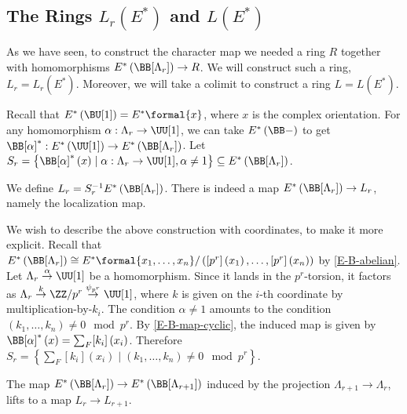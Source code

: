 \subsection{The Rings \texorpdfstring{$L_r\left(E^*\right)$}{Lr(E*)} and \texorpdfstring{$L\left(E^*\right)$}{L(E*)}}

As we have seen, to construct the character map we needed a ring $R$ together with homomorphisms $E^*\left(\BB[\Lambda_r]\right) \to R$.
We will construct such a ring, $L_r = L_r\left(E^*\right)$.
Moreover, we will take a colimit to construct a ring $L = L\left(E^*\right)$.

Recall that $E^*\left(\BU[1]\right) = E^*\formal{x}$, where $x$ is the complex orientation.
For any homomorphism $\alpha: \Lambda_r \to \UU[1]$, we can take $E^*\left(\BB-\right)$ to get $\BB[\alpha]^*: E^*\left(\UU[1]\right) \to E^*\left(\BB[\Lambda_r]\right)$.
Let $S_r = \left\{ \BB[\alpha]^*\left(x\right) \mid \alpha: \Lambda_r \to \UU[1], \alpha \neq 1 \right\} \subseteq E^*\left(\BB[\Lambda_r]\right)$.

\begin{definition}\label{Lr}
	We define $L_r = S_r^{-1} E^*\left(\BB[\Lambda_r]\right)$.
	There is indeed a map $E^*\left(\BB[\Lambda_r]\right) \to L_r$, namely the localization map.
\end{definition}

We wish to describe the above construction with coordinates, to make it more explicit.
Recall that $E^*\left(\BB[\Lambda_r]\right) \cong E^*\formal{x_1, \dotsc, x_n}/\left(\left[p^r\right]\left(x_1\right), \dotsc, \left[p^r\right]\left(x_n\right)\right)$ by \cref{E-B-abelian}.
Let $\Lambda_r \overset{\alpha}{\to} \UU[1]$ be a homomorphism.
Since it lands in the $p^r$-torsion, it factors as $\Lambda_r \overset{k}{\to} \ZZ/{p^r} \overset{\psi_{p^r}}{\to} \UU[1]$, where $k$ is given on the $i$-th coordinate by multiplication-by-$k_i$.
The condition $\alpha \neq 1$ amounts to the condition $\left(k_1, \dotsc, k_n\right) \neq 0 \mod p^r$.
By \cref{E-B-map-cyclic}, the induced map is given by $\BB[\alpha]^*\left(x\right) = \sum_F [k_i]\left(x_i\right)$.
Therefore $S_r = \left\{ \sum_F [k_i]\left(x_i\right) \mid \left(k_1, \dotsc, k_n\right) \neq 0 \mod p^r\right\}$.

\begin{proposition}
	The map $E^*\left(\BB[\Lambda_r]\right) \to E^*\left(\BB[\Lambda_{r+1}]\right)$ induced by the projection $\Lambda_{r+1} \to \Lambda_r$, lifts to a map $L_r \to L_{r+1}$.
\end{proposition}


